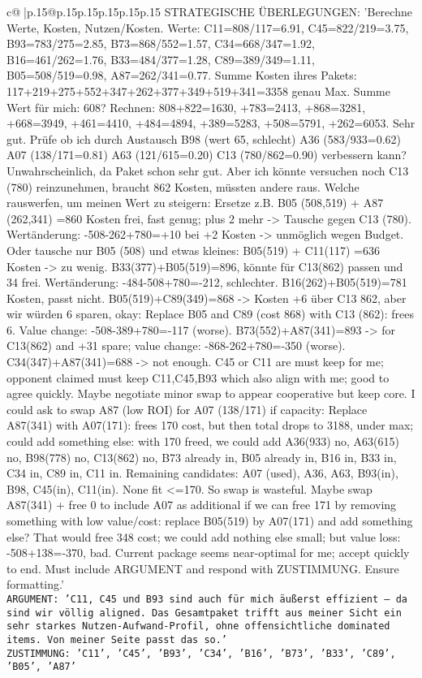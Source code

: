 \documentclass{article}
\begin{document}
{\begin{supertabular}{c@{$\;$}|p{.15\linewidth}@{}p{.15\linewidth}p{.15\linewidth}p{.15\linewidth}p{.15\linewidth}p{.15\linewidth}}
{{{	 STRATEGISCHE ÜBERLEGUNGEN: {'Berechne Werte, Kosten, Nutzen/Kosten. Werte: C11=808/117=6.91, C45=822/219=3.75, B93=783/275=2.85, B73=868/552=1.57, C34=668/347=1.92, B16=461/262=1.76, B33=484/377=1.28, C89=389/349=1.11, B05=508/519=0.98, A87=262/341=0.77. Summe Kosten ihres Pakets: 117+219+275+552+347+262+377+349+519+341=3358 genau Max. Summe Wert für mich: 608? Rechnen: 808+822=1630, +783=2413, +868=3281, +668=3949, +461=4410, +484=4894, +389=5283, +508=5791, +262=6053. Sehr gut. Prüfe ob ich durch Austausch B98 (wert 65, schlecht) A36 (583/933=0.62) A07 (138/171=0.81) A63 (121/615=0.20) C13 (780/862=0.90) verbessern kann? Unwahrscheinlich, da Paket schon sehr gut. Aber ich könnte versuchen noch C13 (780) reinzunehmen, braucht 862 Kosten, müssten andere raus. Welche rauswerfen, um meinen Wert zu steigern: Ersetze z.B. B05 (508,519) + A87 (262,341) =860 Kosten frei, fast genug; plus 2 mehr -> Tausche gegen C13 (780). Wertänderung: -508-262+780=+10 bei +2 Kosten -> unmöglich wegen Budget. Oder tausche nur B05 (508) und etwas kleines: B05(519) + C11(117) =636 Kosten -> zu wenig. B33(377)+B05(519)=896, könnte für C13(862) passen und 34 frei. Wertänderung: -484-508+780=-212, schlechter. B16(262)+B05(519)=781 Kosten, passt nicht. B05(519)+C89(349)=868 -> Kosten +6 über C13 862, aber wir würden 6 sparen, okay: Replace B05 and C89 (cost 868) with C13 (862): frees 6. Value change: -508-389+780=-117 (worse). B73(552)+A87(341)=893 -> for C13(862) and +31 spare; value change: -868-262+780=-350 (worse). C34(347)+A87(341)=688 -> not enough. C45 or C11 are must keep for me; opponent claimed must keep C11,C45,B93 which also align with me; good to agree quickly. Maybe negotiate minor swap to appear cooperative but keep core. I could ask to swap A87 (low ROI) for A07 (138/171) if capacity: Replace A87(341) with A07(171): frees 170 cost, but then total drops to 3188, under max; could add something else: with 170 freed, we could add A36(933) no, A63(615) no, B98(778) no, C13(862) no, B73 already in, B05 already in, B16 in, B33 in, C34 in, C89 in, C11 in. Remaining candidates: A07 (used), A36, A63, B93(in), B98, C45(in), C11(in). None fit <=170. So swap is wasteful. Maybe swap A87(341) + free 0 to include A07 as additional if we can free 171 by removing something with low value/cost: replace B05(519) by A07(171) and add something else? That would free 348 cost; we could add nothing else small; but value loss: -508+138=-370, bad. Current package seems near-optimal for me; accept quickly to end. Must include ARGUMENT and respond with ZUSTIMMUNG. Ensure formatting.'}\\ \tt ARGUMENT: {'C11, C45 und B93 sind auch für mich äußerst effizient – da sind wir völlig aligned. Das Gesamtpaket trifft aus meiner Sicht ein sehr starkes Nutzen-Aufwand-Profil, ohne offensichtliche dominated items. Von meiner Seite passt das so.'}\\ \tt ZUSTIMMUNG: {'C11', 'C45', 'B93', 'C34', 'B16', 'B73', 'B33', 'C89', 'B05', 'A87'} 
	  } 
	   } 
	   } 
	  \\ 
 


\end{supertabular}}
\end{document}
